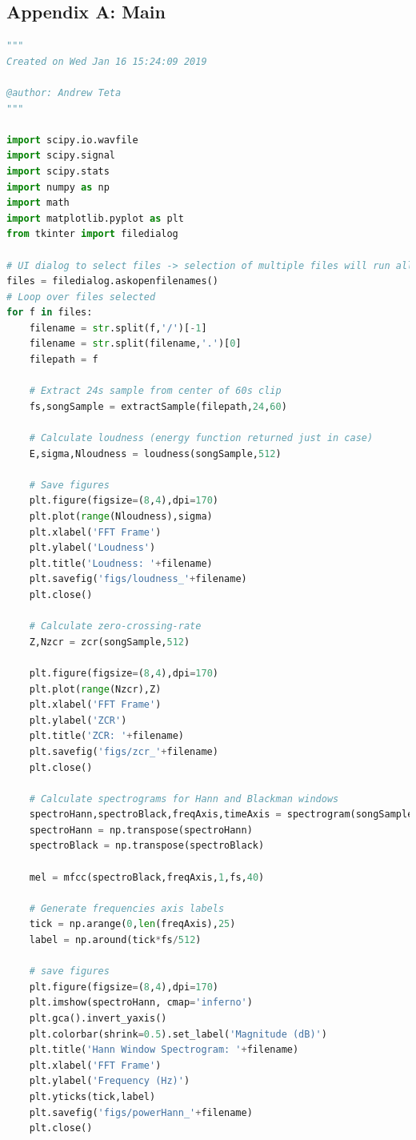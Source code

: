 \documentclass[11pt,a4paper]{article}
\begin{document}
\subsection{Appendix A: Main} \label{app:main}
	\begin{lstlisting}[language=Python,label={lst:main}]
"""
Created on Wed Jan 16 15:24:09 2019

@author: Andrew Teta
"""

import scipy.io.wavfile
import scipy.signal
import scipy.stats
import numpy as np
import math
import matplotlib.pyplot as plt
from tkinter import filedialog

# UI dialog to select files -> selection of multiple files will run all functions for each file
files = filedialog.askopenfilenames()
# Loop over files selected
for f in files:
    filename = str.split(f,'/')[-1]
    filename = str.split(filename,'.')[0]
    filepath = f

    # Extract 24s sample from center of 60s clip
    fs,songSample = extractSample(filepath,24,60)

    # Calculate loudness (energy function returned just in case)
    E,sigma,Nloudness = loudness(songSample,512)

    # Save figures
    plt.figure(figsize=(8,4),dpi=170)
    plt.plot(range(Nloudness),sigma)
    plt.xlabel('FFT Frame')
    plt.ylabel('Loudness')
    plt.title('Loudness: '+filename)
    plt.savefig('figs/loudness_'+filename)
    plt.close()

    # Calculate zero-crossing-rate
    Z,Nzcr = zcr(songSample,512)

    plt.figure(figsize=(8,4),dpi=170)
    plt.plot(range(Nzcr),Z)
    plt.xlabel('FFT Frame')
    plt.ylabel('ZCR')
    plt.title('ZCR: '+filename)
    plt.savefig('figs/zcr_'+filename)
    plt.close()

    # Calculate spectrograms for Hann and Blackman windows
    spectroHann,spectroBlack,freqAxis,timeAxis = spectrogram(songSample,fs,512)
    spectroHann = np.transpose(spectroHann)
    spectroBlack = np.transpose(spectroBlack)

    mel = mfcc(spectroBlack,freqAxis,1,fs,40)

    # Generate frequencies axis labels
    tick = np.arange(0,len(freqAxis),25)
    label = np.around(tick*fs/512)

    # save figures
    plt.figure(figsize=(8,4),dpi=170)
    plt.imshow(spectroHann, cmap='inferno')
    plt.gca().invert_yaxis()
    plt.colorbar(shrink=0.5).set_label('Magnitude (dB)')
    plt.title('Hann Window Spectrogram: '+filename)
    plt.xlabel('FFT Frame')
    plt.ylabel('Frequency (Hz)')
    plt.yticks(tick,label)
    plt.savefig('figs/powerHann_'+filename)
    plt.close()


\end{lstlisting}
\end{document}
